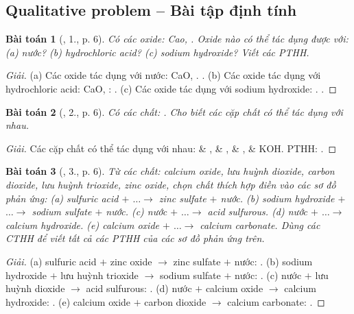 \documentclass{article}
\newtheorem{baitoan}{Bài toán}
\begin{document}
\subsection{Qualitative problem -- Bài tập định tính}

\begin{baitoan}[\cite{SGK_Hoa_Hoc_9}, 1., p. 6]
	Có các oxide: \emph{Cao, }. Oxide nào có thể tác dụng được với: (a) nước? (b) hydrochloric acid? (c) sodium hydroxide? Viết các PTHH.
\end{baitoan}

\begin{proof}[Giải]
	(a) Các oxide tác dụng với nước: CaO, . . (b) Các oxide tác dụng với hydrochloric acid: CaO, : . (c) Các oxide tác dụng với sodium hydroxide: . .
\end{proof}

\begin{baitoan}[\cite{SGK_Hoa_Hoc_9}, 2., p. 6]
	Có các chất: \emph{}. Cho biết các cặp chất có thể tác dụng với nhau.
\end{baitoan}

\begin{proof}[Giải]
	Các cặp chất có thể tác dụng với nhau:  \& ,  \& ,  \& ,  \& KOH. PTHH: .
\end{proof}

\begin{baitoan}[\cite{SGK_Hoa_Hoc_9}, 3., p. 6]
	Từ các chất: calcium oxide, lưu huỳnh dioxide, carbon dioxide, lưu huỳnh trioxide, zinc oxide, chọn chất thích hợp điền vào các sơ đồ phản ứng: (a) sulfuric acid $+$ $\ldots\to$ zinc sulfate $+$ nước. (b) sodium hydroxide $+$ $\ldots\to$ sodium sulfate $+$ nước. (c) nước $+$ $\ldots\to$ acid sulfurous. (d) nước $+$ $\ldots\to$ calcium hydroxide. (e) calcium oxide $+$ $\ldots\to$ calcium carbonate. Dùng các CTHH để viết tất cả các PTHH của các sơ đồ phản ứng trên.
\end{baitoan}

\begin{proof}[Giải]
	(a) sulfuric acid $+$ zinc oxide $\to$ zinc sulfate $+$ nước: . (b) sodium hydroxide $+$ lưu huỳnh trioxide $\to$ sodium sulfate $+$ nước: . (c) nước $+$ lưu huỳnh dioxide $\to$ acid sulfurous: . (d) nước $+$ calcium oxide $\to$ calcium hydroxide: . (e) calcium oxide $+$ carbon dioxide $\to$ calcium carbonate: .
\end{proof}
\end{document}
